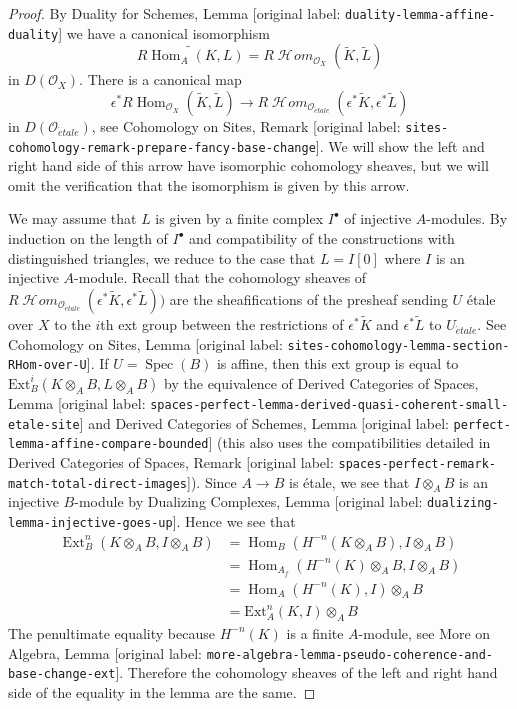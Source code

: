 \documentclass[10pt,a4paper]{article}
\theoremstyle{plain}
\theoremstyle{definition}
\theoremstyle{remark}
\numberwithin{equation}{subsection}
\def\Spec{\mathop{\mathrm{Spec}}}
\def\Hom{\mathop{\mathrm{Hom}}\nolimits}
\def\Ext{\mathop{\mathrm{Ext}}\nolimits}
\def\SheafHom{\mathop{\mathcal{H}\!\mathit{om}}\nolimits}
\def\etale{{\acute{e}tale}}
\begin{document}
\begin{proof}
By Duality for Schemes, Lemma \textnormal{[original label: \nolinkurl{duality-lemma-affine-duality}]}
we have a canonical isomorphism
$$
\widetilde{R\Hom_A(K, L)} =
R\SheafHom_{\mathcal{O}_X}(\widetilde{K}, \widetilde{L})
$$
in $D(\mathcal{O}_X)$. There is a canonical map
$$
\epsilon^*R\Hom_{\mathcal{O}_X}(\widetilde{K}, \widetilde{L})
\longrightarrow
R\SheafHom_{\mathcal{O}_\etale}(\epsilon^*\widetilde{K},
\epsilon^*\widetilde{L})
$$
in $D(\mathcal{O}_\etale)$, see Cohomology on Sites, Remark
\textnormal{[original label: \nolinkurl{sites-cohomology-remark-prepare-fancy-base-change}]}.
We will show the left and right hand side of this arrow
have isomorphic cohomology sheaves, but we will omit the
verification that the isomorphism is given by this arrow.

\medskip\noindent
We may assume that $L$ is given by a finite complex $I^\bullet$
of injective $A$-modules. By induction on the length of $I^\bullet$
and compatibility of the constructions with distinguished triangles,
we reduce to the case that $L = I[0]$ where $I$ is an injective $A$-module.
Recall that the cohomology sheaves of
$R\SheafHom_{\mathcal{O}_\etale}(\epsilon^*\widetilde{K},
\epsilon^*\widetilde{L}))$
are the sheafifications of the presheaf sending $U$ \'etale
over $X$ to the $i$th ext group between the restrictions of
$\epsilon^*\widetilde{K}$ and $\epsilon^*\widetilde{L}$
to $U_\etale$. See
Cohomology on Sites, Lemma
\textnormal{[original label: \nolinkurl{sites-cohomology-lemma-section-RHom-over-U}]}.
If $U = \Spec(B)$ is affine, then this ext group
is equal to $\text{Ext}^i_B(K \otimes_A B, L \otimes_A B)$
by the equivalence of
Derived Categories of Spaces, Lemma
\textnormal{[original label: \nolinkurl{spaces-perfect-lemma-derived-quasi-coherent-small-etale-site}]} and
Derived Categories of Schemes, Lemma
\textnormal{[original label: \nolinkurl{perfect-lemma-affine-compare-bounded}]}
(this also uses the compatibilities detailed in
Derived Categories of Spaces, Remark
\textnormal{[original label: \nolinkurl{spaces-perfect-remark-match-total-direct-images}]}).
Since $A \to B$ is \'etale, we see that
$I \otimes_A B$ is an injective $B$-module
by Dualizing Complexes, Lemma \textnormal{[original label: \nolinkurl{dualizing-lemma-injective-goes-up}]}.
Hence we see that
\begin{align*}
\Ext^n_B(K \otimes_A B, I \otimes_A B)
& =
\Hom_B(H^{-n}(K \otimes_A B), I \otimes_A B) \\
& =
\Hom_{A_f}(H^{-n}(K) \otimes_A B, I \otimes_A B) \\
& =
\Hom_A(H^{-n}(K), I) \otimes_A B \\
& =
\text{Ext}^n_A(K, I) \otimes_A B
\end{align*}
The penultimate equality because $H^{-n}(K)$ is a finite $A$-module, see
More on Algebra, Lemma
\textnormal{[original label: \nolinkurl{more-algebra-lemma-pseudo-coherence-and-base-change-ext}]}.
Therefore the cohomology sheaves of the left and right hand
side of the equality in the lemma are the same.
\end{proof}
\end{document}
